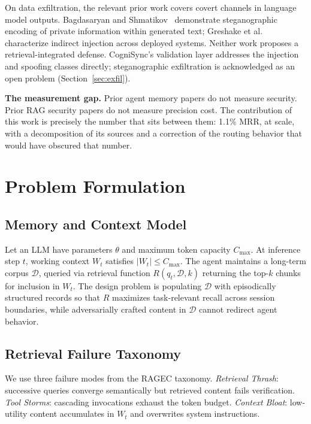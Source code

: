 \documentclass[sigconf,authordraft]{acmart}
\begin{document}
On data exfiltration, the relevant prior work covers covert channels in
language model outputs. Bagdasaryan and
Shmatikov~\cite{bagdasaryan2023covert} demonstrate steganographic encoding
of private information within generated text;
Greshake et al.~\cite{greshake2023indirect} characterize indirect
injection across deployed systems. Neither work proposes a
retrieval-integrated defense. CogniSync's validation layer addresses the
injection and spoofing classes directly; steganographic exfiltration is
acknowledged as an open problem (Section~\ref{sec:exfil}).

\textbf{The measurement gap.} Prior agent memory papers do not measure
security. Prior RAG security papers do not measure precision cost. The
contribution of this work is precisely the number that sits between them:
1.1\% MRR, at scale, with a decomposition of its sources and a correction
of the routing behavior that would have obscured that number.

\section{Problem Formulation}

\subsection{Memory and Context Model}

Let an LLM have parameters $\theta$ and maximum token capacity
$C_{\max}$. At inference step $t$, working context $W_t$ satisfies
$\lvert W_t\rvert \leq C_{\max}$. The agent maintains a long-term corpus
$\mathcal{D}$, queried via retrieval function $R(q_t,\mathcal{D},k)$
returning the top-$k$ chunks for inclusion in $W_t$. The design problem
is populating $\mathcal{D}$ with episodically structured records so that
$R$ maximizes task-relevant recall across session boundaries, while
adversarially crafted content in $\mathcal{D}$ cannot redirect agent
behavior.

\subsection{Retrieval Failure Taxonomy}

We use three failure modes from the RAGEC taxonomy. \emph{Retrieval
Thrash}: successive queries converge semantically but retrieved content
fails verification. \emph{Tool Storms}: cascading invocations exhaust the
token budget. \emph{Context Bloat}: low-utility content accumulates in
$W_t$ and overwrites system instructions.
\end{document}
